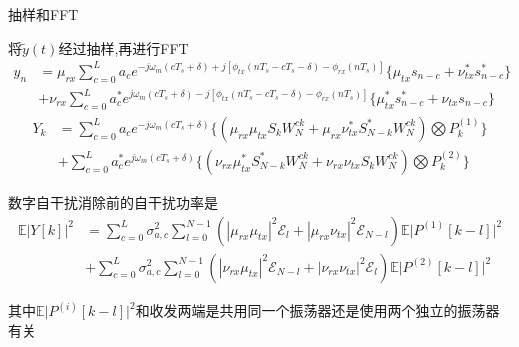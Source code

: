 \begin{frame}{抽样和FFT}
	\begin{block}{将$\tilde{y}(t)$经过抽样,再进行FFT}
		\begin{equation*}
			\begin{split}
			y_n &= \mu_{rx} \sum_{c=0}^{L}a_ce^{-j\omega_{m}(cT_s + \delta)+j[\phi_{tx}(nT_s-cT_s-\delta)-\phi_{rx}(nT_s)]} \{ \mu_{tx}s_{n-c}+\nu_{tx}^{*}s^{*}_{n-c} \} \\
			&+ \nu_{rx} \sum_{c=0}^{L}a_c^*e^{j\omega_{m}(cT_s + \delta)-j[\phi_{tx}(nT_s-cT_s-\delta)-\phi_{rx}(nT_s)]} \{ \mu_{tx}^*s^*_{n-c}+\nu_{tx}s_{n-c} \}
			\end{split}
		\end{equation*}
		\begin{equation*}
			\begin{split}
			Y_k &= \sum_{c=0}^{L}a_ce^{-j\omega_{m}(cT_s + \delta)} \big\{ (\mu_{rx}\mu_{tx}S_kW_N^{ck}+\mu_{rx}\nu_{tx}^*S^*_{N-k}W_N^{ck}) \bigotimes P^{(1)}_k  \big\} \\
			&+ \sum_{c=0}^{L}a_c^*e^{j\omega_{m}(cT_s + \delta)}  \big\{ (\nu_{rx}\mu_{tx}^*S^*_{N-k}W_N^{ck}+\nu_{rx}\nu_{tx}S_kW_N^{ck}) \bigotimes P^{(2)}_k  \big\}
			\end{split}
		\end{equation*}
	\end{block}
\end{frame}

\begin{frame}{数字自干扰消除前的自干扰功率是}
	\begin{equation*}
	\begin{split}
	\mathbb{E}|Y[k]|^2 &=\sum_{c=0}^{L}\sigma_{a,c}^2\sum_{l=0}^{N-1}(|\mu_{rx}\mu_{tx}|^2\mathcal{E}_{l}+|\mu_{rx}\nu_{tx}|^2\mathcal{E}_{N-l})\mathbb{E}\big| P^{(1)}[k-l]\big|^2\\
	&+ \sum_{c=0}^{L}\sigma_{a,c}^2\sum_{l=0}^{N-1}(|\nu_{rx}\mu_{tx}|^2\mathcal{E}_{N-l}+|\nu_{rx}\nu_{tx}|^2\mathcal{E}_{l}) \mathbb{E}\big|P^{(2)}[k-l]\big|^2
	\end{split}
	\end{equation*}
	
	其中$\mathbb{E}\big|P^{(i)}[k-l]\big|^2$和收发两端是共用同一个振荡器还是使用两个独立的振荡器有关  
	
\end{frame}

